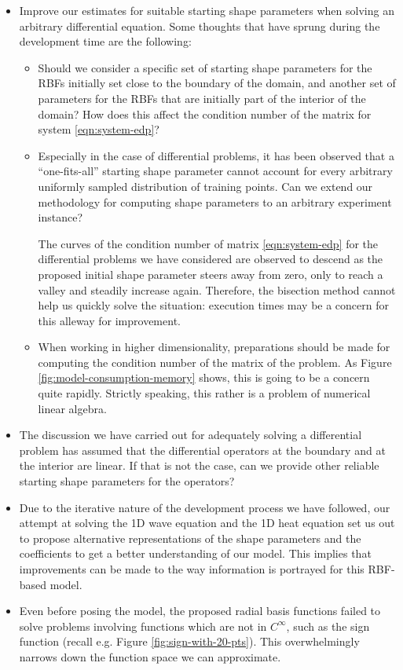 \documentclass[12pt]{report} %
\begin{document}
\begin{itemize}
  \item Improve our estimates for suitable starting shape parameters when solving an arbitrary differential equation. Some thoughts that have sprung during the development time are the following:
  \begin{itemize}
    \item Should we consider a specific set of starting shape parameters for the RBFs initially set close to the boundary of the domain, and another set of parameters for the RBFs that are initially part of the interior of the domain? How does this affect the condition number of the matrix for system \eqref{eqn:system-edp}?
    \item Especially in the case of differential problems, it has been observed that a ``one-fits-all'' starting shape parameter cannot account for every arbitrary uniformly sampled distribution of training points. Can we extend our methodology for computing shape parameters to an arbitrary experiment instance? 
    
    The curves of the condition number of matrix \eqref{eqn:system-edp} for the differential problems we have considered are observed to descend as the proposed initial shape parameter steers away from zero, only to reach a valley and steadily increase again. Therefore, the bisection method cannot help us quickly solve the situation: execution times may be a concern for this alleway for improvement.

    \item When working in higher dimensionality, preparations should be made for computing the condition number of the matrix of the problem. As Figure \ref{fig:model-consumption-memory} shows, this is going to be a concern quite rapidly. Strictly speaking, this rather is a problem of numerical linear algebra.
  \end{itemize}
  
  \item The discussion we have carried out for adequately solving a differential problem has assumed that the differential operators at the boundary and at the interior are linear. If that is not the case, can we provide other reliable starting shape parameters for the operators?
  \item Due to the iterative nature of the development process we have followed, our attempt at solving the 1D wave equation and the 1D heat equation set us out to propose alternative representations of the shape parameters and the coefficients to get a better understanding of our model. This implies that improvements can be made to the way information is portrayed for this RBF-based model.
  \item Even before posing the model, the proposed radial basis functions failed to solve problems involving functions which are not in $C^\infty$, such as the sign function (recall e.g. Figure \ref{fig:sign-with-20-pts}). This overwhelmingly narrows down the function space we can approximate. 
  

\end{itemize}
\end{document}
